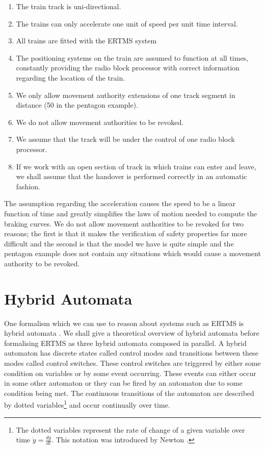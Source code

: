 \begin{enumerate}

\item The train track is uni-directional.

\item The trains can only accelerate one unit of speed per unit time interval.

\item All trains are fitted with the ERTMS system

\item The positioning systems on the train are assumed to function at all times, constantly providing the radio block processor with correct information regarding the location of the train.

\item We only allow movement authority extensions of one track segment in distance (50 in the pentagon example).

\item We do not allow movement authorities to be revoked.

\item  We assume that the track will be under the control of one radio block processor.

\item  If we work with an open section of track in which trains can enter and leave, we shall assume that the handover is performed correctly in an automatic fashion.

\end{enumerate}

The assumption regarding the acceleration causes the speed to be a linear function of time and greatly simplifies the laws of motion needed to compute the braking curves.   We do not allow movement authorities to be revoked for two reasons; the first is that it makes the verification of safety properties far more difficult and the second is that the model we have is quite simple and the pentagon example does not contain any situations which would cause a movement authority to be revoked.




\section{Hybrid Automata} \label{sec:hybrid}

One formalism which we can use to reason about systems such as ERTMS is hybrid automata \cite{TH96}. We shall give a theoretical overview of hybrid automata before formalising ERTMS as three hybrid automata composed in parallel. A hybrid automaton has discrete states called control modes and transitions between these modes called control switches. These control switches are triggered by either some condition on variables or by some event occurring. These events can either occur in some other automaton or they can be fired by an automaton due to some condition being met. The continuous transitions of the automaton are described by dotted variables\footnote{The dotted variables represent the rate of change of a given variable over time $\dot{y} = \frac{dy}{dt}$. This notation was introduced by Newton \cite{CF28}.} and occur continually over time.



